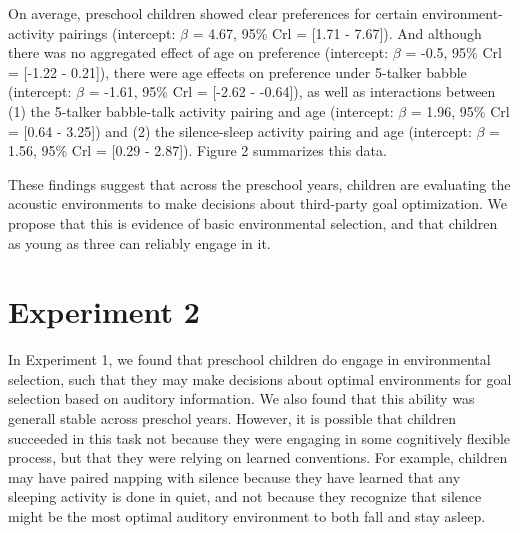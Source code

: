 \documentclass[10pt, letterpaper]{article}
\begin{document}
On average, preschool children showed clear preferences for certain
environment-activity pairings (intercept: \(\beta\) = 4.67, 95\% Crl =
{[}1.71 - 7.67{]}). And although there was no aggregated effect of age
on preference (intercept: \(\beta\) = -0.5, 95\% Crl = {[}-1.22 -
0.21{]}), there were age effects on preference under 5-talker babble
(intercept: \(\beta\) = -1.61, 95\% Crl = {[}-2.62 - -0.64{]}), as well
as interactions between (1) the 5-talker babble-talk activity pairing
and age (intercept: \(\beta\) = 1.96, 95\% Crl = {[}0.64 - 3.25{]}) and
(2) the silence-sleep activity pairing and age (intercept: \(\beta\) =
1.56, 95\% Crl = {[}0.29 - 2.87{]}). Figure 2 summarizes this data.

These findings suggest that across the preschool years, children are
evaluating the acoustic environments to make decisions about third-party
goal optimization. We propose that this is evidence of basic
environmental selection, and that children as young as three can
reliably engage in it.

\hypertarget{experiment-2}{%
\section{Experiment 2}\label{experiment-2}}

In Experiment 1, we found that preschool children do engage in
environmental selection, such that they may make decisions about optimal
environments for goal selection based on auditory information. We also
found that this ability was generall stable across preschol years.
However, it is possible that children succeeded in this task not because
they were engaging in some cognitively flexible process, but that they
were relying on learned conventions. For example, children may have
paired napping with silence because they have learned that any sleeping
activity is done in quiet, and not because they recognize that silence
might be the most optimal auditory environment to both fall and stay
asleep.
\end{document}
